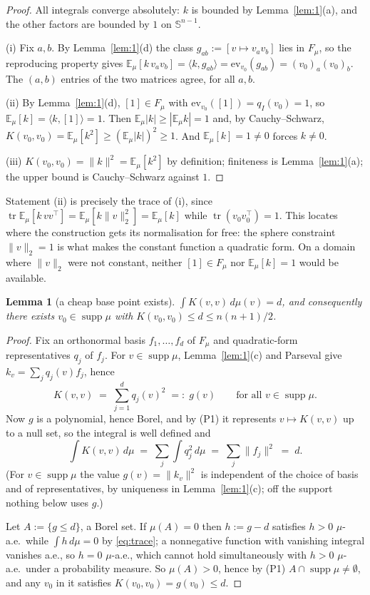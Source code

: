 \documentclass[11pt]{article}
\newtheorem{lemma}[theorem]{Lemma}
\theoremstyle{remark}
\newcommand{\Sph}{\mathbb{S}^{n-1}}
\newcommand{\Ex}{\mathbb{E}}
\newcommand{\Fm}{F_\mu}
\newcommand{\supp}{\operatorname{supp}}
\newcommand{\ev}{\mathrm{ev}}
\DeclareMathOperator{\tr}{tr}
\begin{document}
\begin{proof}
All integrals converge absolutely: $k$ is bounded by Lemma~\ref{lem:1}(a), and the other
factors are bounded by $1$ on $\Sph$.

(i) Fix $a,b$. By Lemma~\ref{lem:1}(d) the class $g_{ab}:=[v\mapsto v_av_b]$ lies in $\Fm$, so
the reproducing property gives
$\Ex_\mu[k\,v_av_b]=\langle k,g_{ab}\rangle=\ev_{v_0}(g_{ab})=(v_0)_a(v_0)_b$. The $(a,b)$
entries of the two matrices agree, for all $a,b$.

(ii) By Lemma~\ref{lem:1}(d), $[1]\in\Fm$ with $\ev_{v_0}([1])=q_I(v_0)=1$, so
$\Ex_\mu[k]=\langle k,[1]\rangle=1$. Then $\Ex_\mu|k|\geq|\Ex_\mu k|=1$ and, by
Cauchy--Schwarz, $K(v_0,v_0)=\Ex_\mu[k^2]\geq(\Ex_\mu|k|)^2\geq 1$. And $\Ex_\mu[k]=1\neq 0$
forces $k\neq 0$.

(iii) $K(v_0,v_0)=\|k\|^2=\Ex_\mu[k^2]$ by definition; finiteness is Lemma~\ref{lem:1}(a); the
upper bound is Cauchy--Schwarz against $1$.
\end{proof}

\noindent Statement (ii) is precisely the trace of (i), since
$\tr \Ex_\mu[k\,vv^{\top}]=\Ex_\mu[k\|v\|_2^2]=\Ex_\mu[k]$ while $\tr(v_0v_0^{\top})=1$. This
locates where the construction gets its normalisation for free: the sphere constraint
$\|v\|_2=1$ is what makes the constant function a quadratic form. On a domain where $\|v\|_2$
were not constant, neither $[1]\in\Fm$ nor $\Ex_\mu[k]=1$ would be available.

\begin{lemma}[a cheap base point exists]\label{lem:3}
$\int K(v,v)\,d\mu(v) = d$, and consequently there exists $v_0\in\supp\mu$ with
$K(v_0,v_0)\leq d\leq n(n+1)/2$.
\end{lemma}

\begin{proof}
Fix an orthonormal basis $f_1,\dots,f_d$ of $\Fm$ and quadratic-form representatives $q_j$ of
$f_j$. For $v\in\supp\mu$, Lemma~\ref{lem:1}(c) and Parseval give $k_v=\sum_j q_j(v)f_j$, hence
\begin{equation}
  K(v,v) \;=\; \sum_{j=1}^{d} q_j(v)^2 \;=:\; g(v)
  \qquad\text{for all } v\in\supp\mu. \label{eq:pointwise}
\end{equation}
Now $g$ is a polynomial, hence Borel, and by (P1) it represents $v\mapsto K(v,v)$ up to a null
set, so the integral is well defined and
\begin{equation}
  \int K(v,v)\,d\mu \;=\; \sum_j \int q_j^2\,d\mu \;=\; \sum_j\|f_j\|^2 \;=\; d.
  \label{eq:trace}
\end{equation}
(For $v\in\supp\mu$ the value $g(v)=\|k_v\|^2$ is independent of the choice of basis and of
representatives, by uniqueness in Lemma~\ref{lem:1}(c); off the support nothing below uses $g$.)

Let $A:=\{g\leq d\}$, a Borel set. If $\mu(A)=0$ then $h:=g-d$ satisfies $h>0$ $\mu$-a.e.\
while $\int h\,d\mu=0$ by \eqref{eq:trace}; a nonnegative function with vanishing integral
vanishes a.e., so $h=0$ $\mu$-a.e., which cannot hold simultaneously with $h>0$ $\mu$-a.e.\
under a probability measure. So $\mu(A)>0$, hence by (P1) $A\cap\supp\mu\neq\emptyset$, and any
$v_0$ in it satisfies $K(v_0,v_0)=g(v_0)\leq d$.
\end{proof}
\end{document}
